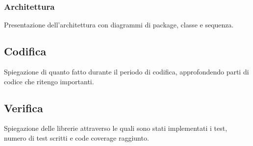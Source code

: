 \subsubsection{Architettura}
Presentazione dell'architettura con diagrammi di package, classe e sequenza.

\subsection{Codifica}
Spiegazione di quanto fatto durante il periodo di codifica, approfondendo parti di codice che ritengo importanti.

\subsection{Verifica}
Spiegazione delle librerie attraverso le quali sono stati implementati i test, numero di test scritti e code coverage raggiunto.








